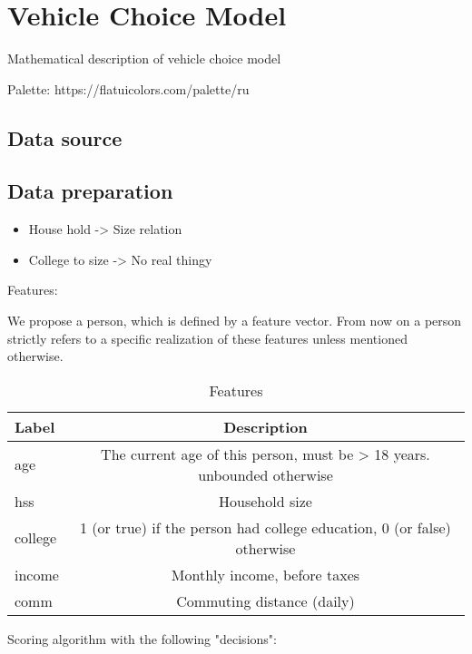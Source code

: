 \clearpage
\section{Vehicle Choice Model}
\label{sec:ChoiceModel}

Mathematical description of vehicle choice model

Palette: https://flatuicolors.com/palette/ru


\subsection{Data source}
\label{sub_sec:DataSource}


\subsection{Data preparation}
\label{sub_sec:DataPreparation}


\begin{itemize}
  \item House hold -> Size relation
  \item College to size -> No real thingy
\end{itemize}

Features:

We propose a person, which is defined by a feature vector. From now on a person strictly refers to a specific realization 
of these features unless mentioned otherwise. 

\begin{longtable}{l | c}
  \caption{Features}
  \label{table:features}
  \\
  \textbf{Label} & \textbf{Description} \\
  \hline
  age & The current age of this person, must be > 18 years. unbounded otherwise \\
  hss & Household size\\
  college & 1 (or true) if the person had college education, 0 (or false) otherwise \\
  income & Monthly income, before taxes \\
  comm & Commuting distance (daily)
\end{longtable}

Scoring algorithm with the following "decisions":

